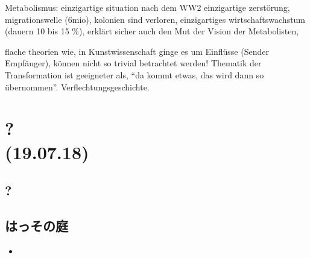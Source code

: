 \documentclass[emulatestandardclasses]{scrartcl}
\begin{document}
Metabolismus: einzigartige situation nach dem WW2 einzigartige zerstörung, migrationswelle (6mio), kolonien sind verloren, einzigartiges wirtschaftswachstum (dauern 10 bis 15 \%), erklärt sicher auch den Mut der Vision der Metabolisten, 

flache theorien wie, in Kunstwissenschaft ginge es um Einflüsse (Sender Empfänger), können nicht so trivial betrachtet werden! Thematik der Transformation ist geeigneter als, "`da kommt etwas, das wird dann so übernommen"'. Verflechtungsgeschichte.

\section{?
\\(19.07.18)}


\subsection{?}

\subsection{はっその庭}

\begin{itemize}
  \item 
\end{itemize}
\end{document}

